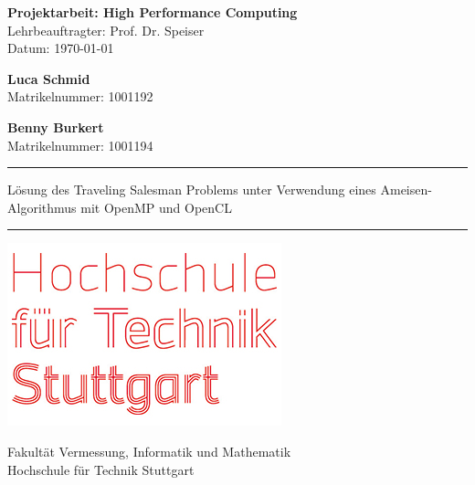 \begin{titlepage}
    \begin{center}
        \vspace*{1cm}

        \textbf{Projektarbeit: High Performance Computing}\\
        Lehrbeauftragter: Prof. Dr. Speiser \\
        Datum: \today

        \vspace{2cm}

        \textbf{Luca Schmid} \\
        Matrikelnummer: 1001192

        \textbf{Benny Burkert} \\
        Matrikelnummer: 1001194
        
        \vspace{4cm}
        \rule[0.3cm]{\textwidth}{0.4pt}
        Lösung des Traveling Salesman Problems unter Verwendung eines Ameisen-Algorithmus mit OpenMP und OpenCL
        \rule{\textwidth}{0.4pt}
        \vspace{2.5cm}

        \includegraphics[scale=0.5]{images/hft-logo.jpg}
        
        \vspace{0.5cm}

        Fakultät Vermessung, Informatik und Mathematik\\
        Hochschule für Technik Stuttgart\\

    \end{center}   
\end{titlepage}